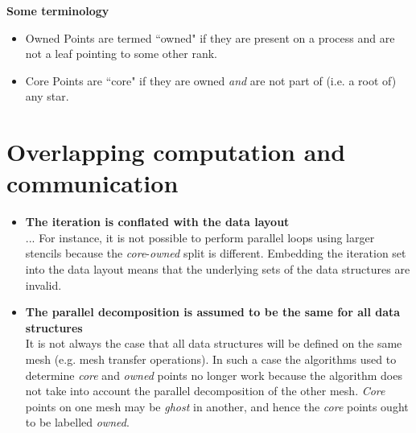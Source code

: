 \documentclass[thesis]{subfiles}
\begin{document}
\begin{figure}


% 


\end{figure}

\textbf{Some terminology}

\begin{itemize}
  \item Owned
    Points are termed ``owned" if they are present on a process and are not a leaf pointing to some other rank.
  \item Core
    Points are ``core" if they are owned \textit{and} are not part of (i.e. a root of) any star.
\end{itemize}


\section{Overlapping computation and communication}


\begin{itemize}
  \item
    \textbf{The iteration is conflated with the data layout}\\
    ...
    For instance, it is not possible to perform parallel loops using larger stencils because the \textit{core}-\textit{owned} split is different.
    Embedding the iteration set into the data layout means that the underlying sets of the data structures are invalid.

  \item
    \textbf{The parallel decomposition is assumed to be the same for all data structures}\\
    It is not always the case that all data structures will be defined on the same mesh (e.g. mesh transfer operations).
    In such a case the algorithms used to determine \textit{core} and \textit{owned} points no longer work because the algorithm does not take into account the parallel decomposition of the other mesh.
    \textit{Core} points on one mesh may be \textit{ghost} in another, and hence the \textit{core} points ought to be labelled \textit{owned}.
\end{itemize}
\end{document}
